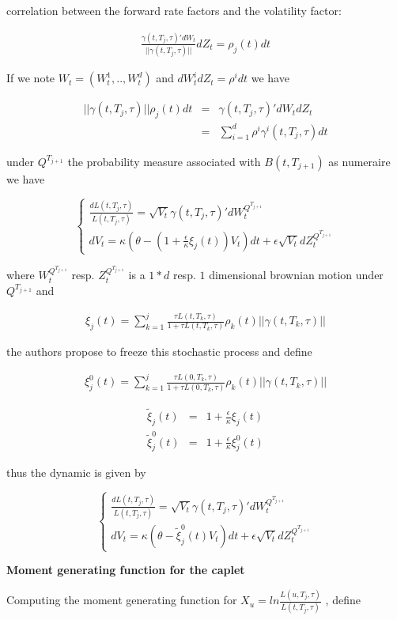 \documentclass[10pt,a4paper,english,landscape]{slides}
\newcommand{\ban}{\begin{eqnarray*}}
\newcommand{\ean}{\end{eqnarray*}}
\newcommand{\ba}{\begin{eqnarray}}
\newcommand{\ea}{\end{eqnarray}}
\begin{document}
correlation between the forward rate factors and the volatility factor:

\ban
\frac{\gamma(t,T_j,\tau)'dW_t}{||\gamma(t,T_j,\tau)||}dZ_t=\rho_j(t)dt
\ean

If we note $W_t=(W^1_t,..,W^d_t)$ and $dW^i_tdZ_t=\rho^idt$ we have 

\ba
||\gamma(t,T_j,\tau)||\rho_j(t)dt&=& \gamma(t,T_j,\tau)'dW_tdZ_t\\
&=&\sum_{i=1}^d \rho^i\gamma^i(t,T_j,\tau) dt \label{rhovol}
\ea



under  $Q^{T_{j+1}}$ the probability measure associated with $B(t,T_{j+1})$  as numeraire  we have

\[
\left\lbrace 
\begin{array}{l}
\frac{dL(t,T_j,\tau)}{L(t,T_j,\tau)}=\sqrt{V_t}\gamma(t,T_j,\tau)'dW^{Q^{T_{j+1}}}_t \\
dV_t=\kappa(\theta - (1+\frac{\epsilon}{\kappa}\xi_j(t))V_t)dt+\epsilon \sqrt{V_t}dZ^{Q^{T_{j+1}}}_t
\end{array}
\right.
\]

where $W^{Q^{T_{j+1}}}_t$ resp. $Z^{Q^{T_{j+1}}}_t$ is a $1*d$ resp. $1$ dimensional brownian motion under $Q^{T_{j+1}}$ and 

\ban
\xi_j(t)=\sum_{k=1}^j\frac{\tau L(t,T_k,\tau)}{1+\tau L(t,T_k,\tau)}\rho_k(t)||\gamma(t,T_k,\tau)|| 
\ean

the authors propose to freeze this stochastic process and  define 

\ban
\xi_j^0(t)=\sum_{k=1}^j\frac{\tau L(0,T_k,\tau)}{1+\tau L(0,T_k,\tau)}\rho_k(t)||\gamma(t,T_k,\tau)|| 
\ean

\ban
\tilde \xi_j(t)&=&1+\frac{\epsilon}{\kappa} \xi_j(t)\\
\tilde \xi_j^0(t)&=&1+\frac{\epsilon}{\kappa}\xi_j^0(t)
\ean

thus the dynamic is given by

\[
\left\lbrace 
\begin{array}{l}
\frac{dL(t,T_j,\tau)}{L(t,T_j,\tau)}=\sqrt{V_t}\gamma(t,T_j,\tau)'dW^{Q^{T_{j+1}}}_t \\
dV_t=\kappa(\theta - \tilde \xi_j^0(t)V_t)dt+\epsilon \sqrt{V_t}dZ^{Q^{T_{j+1}}}_t
\end{array}
\right.
\]

{\bf Moment generating function for the caplet}

Computing the moment generating function for $X_u=ln \frac{L(u,T_j,\tau)}{L(t,T_j,\tau)}$ , define 
\end{document}
